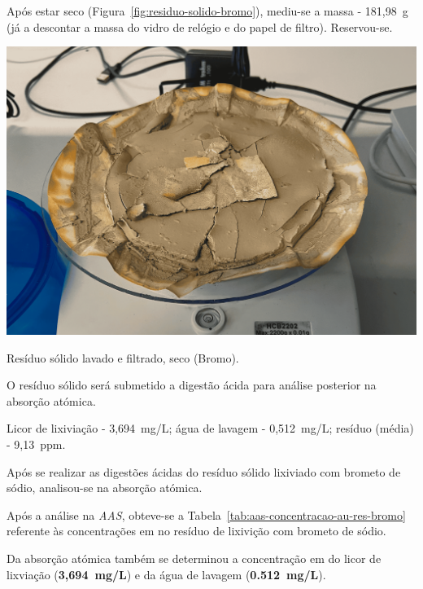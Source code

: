 Após estar seco (Figura~\ref{fig:residuo-solido-bromo}), mediu-se a massa - 181,98~g (já a descontar a massa do vidro de relógio e do papel de filtro).
Reservou-se.

\begin{marginfigure}[-1cm]
    \centering
    \includegraphics[width=0.9\linewidth]{figures/residuo solido lavado e filtrado - bromo.png}
    \caption{Resíduo sólido lavado e filtrado, seco (Bromo).}
    \label{fig:residuo-solido-bromo}
\end{marginfigure}

O resíduo sólido será submetido a digestão ácida para análise posterior na absorção atómica.

 Licor de lixiviação - 3,694~mg/L; água de lavagem - 0,512~mg/L; resíduo (média) - 9,13~ppm.

\hrulefill


Após se realizar as digestões ácidas do resíduo sólido lixiviado com brometo de sódio, analisou-se na absorção atómica.

Após a análise na \emph{AAS}, obteve-se a Tabela~\ref{tab:aas-concentracao-au-res-bromo} referente às concentrações em  no resíduo de lixivição com brometo de sódio.

Da absorção atómica também se determinou a concentração em  do licor de lixviação (\textbf{3,694~mg/L}) e da água de lavagem (\textbf{0.512~mg/L}).

\newpage

